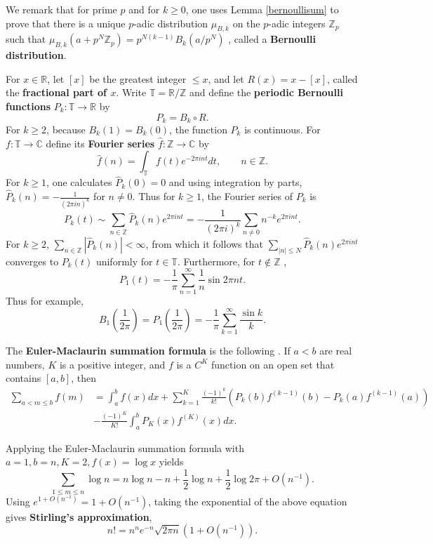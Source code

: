 \documentclass{amsart}
\begin{document}
We remark that for prime $p$ and for $k \geq 0$, one uses Lemma \ref{bernoullisum} to prove that
there is a unique $p$-adic distribution $\mu_{B,k}$ on the $p$-adic integers $\mathbb{Z}_p$ such that
$\mu_{B,k}(a+p^N \mathbb{Z}_p) = p^{N(k-1)} B_k(a/p^N)$ \cite[p.~35, Chapter II, \S 4]{koblitz},
called a \textbf{Bernoulli distribution}.





For $x \in \mathbb{R}$, let $[ x ]$ be the greatest integer $\leq x$, and let $R(x)=x-[x]$, called the \textbf{fractional part of $x$}.
Write $\mathbb{T}=\mathbb{R}/\mathbb{Z}$ and define the 
\textbf{periodic Bernoulli functions} $P_k:\mathbb{T} \to \mathbb{R}$ by
\[
P_k = B_k \circ R.
\] 
For $k \geq 2$, because $B_k(1)=B_k(0)$, the function $P_k$ is continuous. 
For $f:\mathbb{T} \to \mathbb{C}$ define its \textbf{Fourier series} $\hat{f}:\mathbb{Z} \to \mathbb{C}$ by
\[
\hat{f}(n) = \int_\mathbb{T} f(t) e^{-2\pi int} dt,\qquad n \in \mathbb{Z}.
\]
For $k \geq 1$, one calculates $\widehat{P}_k(0)=0$ and using integration by parts, $\widehat{P}_k(n)= - \frac{1}{(2\pi in)^k}$ for
$n \neq 0$.
Thus for $k \geq 1$, the Fourier series of $P_k$ is
\[
P_k(t) \sim \sum_{n \in \mathbb{Z}} \widehat{P}_k(n) e^{2\pi int} = -\frac{1}{(2\pi i)^k} \sum_{n \neq 0} n^{-k} e^{2\pi int}.
\]
For $k \geq 2$, $\sum_{n \in \mathbb{Z}} |\widehat{P}_k(n)|<\infty$, from which it follows that $\sum_{|n| \leq N}  \widehat{P}_k(n) e^{2\pi int}$
converges to $P_k(t)$ uniformly for $t \in \mathbb{T}$.
Furthermore, for $t \not \in \mathbb{Z}$  \cite[p.~499, Theorem B.2]{multiplicative},
\[
P_1(t) = - \frac{1}{\pi} \sum_{n=1}^\infty \frac{1}{n} \sin 2\pi nt.
\]
Thus for example,
\[
B_1\left(\frac{1}{2\pi} \right) = P_1\left(\frac{1}{2\pi} \right) = - \frac{1}{\pi} \sum_{k=1}^\infty \frac{\sin k}{k}.
\]


The \textbf{Euler-Maclaurin summation formula} is the following \cite[p.~500, Theorem B.5]{multiplicative}. If $a<b$ are real numbers,
$K$ is a positive integer, and $f$ is a $C^K$ function on an open set that contains $[a,b]$, then 
\begin{align*}
\sum_{a<m \leq b} f(m)&=\int_a^b f(x) dx + \sum_{k=1}^K \frac{(-1)^k}{k!} (P_k(b) f^{(k-1)}(b)-P_k(a) f^{(k-1)}(a))\\
&-\frac{(-1)^K}{K!} \int_a^b P_K(x)  f^{(K)}(x) dx.
\end{align*}

Applying the Euler-Maclaurin summation formula with $a=1, b=n, K=2, f(x)=\log x$ yields \cite[p.~503, Eq. B.25]{multiplicative}
\[
\sum_{1 \leq m \leq n} \log n = n \log n - n  + \frac{1}{2} \log n + \frac{1}{2} \log 2\pi + O(n^{-1}).
\]
Using $e^{1+O(n^{-1})} = 1+O(n^{-1})$, taking the exponential of the above equation gives \textbf{Stirling's approximation},
\[
n! = n^n e^{-n} \sqrt{2\pi n} (1+O(n^{-1})).
\]
\end{document}
